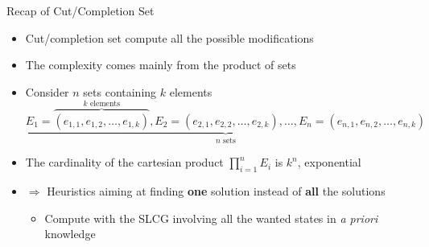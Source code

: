 \documentclass[8pt]{beamer}
\newcommand{\highlight}[1]{\textcolor{blue!50}{\textbf{#1}}}
\begin{document}
\begin{frame}{Recap of Cut/Completion Set}
    \begin{itemize}[<+->]
        \item Cut/completion set compute all the possible modifications
        \item The complexity comes mainly from the product of sets
        \item Consider $n$ sets containing $k$ elements
        $\underbrace{E_1=\overbrace{(e_{1,1},e_{1,2},\ldots,e_{1,k})}^\text{$k$ elements},E_2=(e_{2,1},e_{2,2},\ldots,e_{2,k}),\ldots,E_n=(e_{n,1},e_{n,2},\ldots,e_{n,k})}_\text{$n$ sets}$
        \item The cardinality of the cartesian product $\prod_{i=1}^{n}{E_i}$ is $k^n$, exponential
        \item$\Longrightarrow$ Heuristics aiming at finding \highlight{one} solution instead of \highlight{all} the solutions
        \begin{itemize}
            \item Compute with the SLCG involving all the wanted states in \textit{a priori} knowledge
        \end{itemize}
    \end{itemize}
\end{frame}
\end{document}
